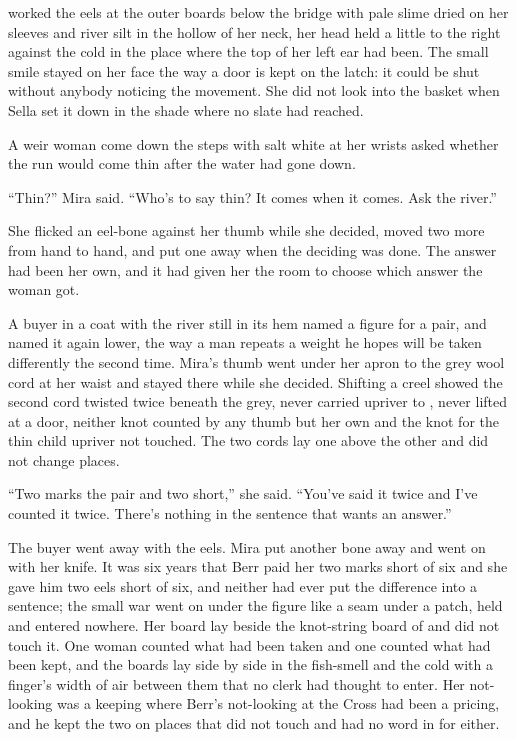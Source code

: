  worked the eels at the outer boards below the bridge with pale slime dried on her sleeves and river silt in the hollow of her neck, her head held a little to the right against the cold in the place where the top of her left ear had been. The small smile stayed on her face the way a door is kept on the latch: it could be shut without anybody noticing the movement. She did not look into the basket when Sella set it down in the shade where no slate had reached.

A weir woman come down the steps with salt white at her wrists asked whether the run would come thin after the water had gone down.

“Thin?” Mira said. “Who's to say thin? It comes when it comes. Ask the river.”

She flicked an eel-bone against her thumb while she decided, moved two more from hand to hand, and put one away when the deciding was done. The answer had been her own, and it had given her the room to choose which answer the woman got.

A buyer in a coat with the river still in its hem named a figure for a pair, and named it again lower, the way a man repeats a weight he hopes will be taken differently the second time. Mira's thumb went under her apron to the grey wool cord at her waist and stayed there while she decided. Shifting a creel showed the second cord twisted twice beneath the grey, never carried upriver to , never lifted at a door, neither knot counted by any thumb but her own and the knot for the thin child upriver not touched. The two cords lay one above the other and did not change places.

“Two marks the pair and two short,” she said. “You've said it twice and I've counted it twice. There's nothing in the sentence that wants an answer.”

The buyer went away with the eels. Mira put another bone away and went on with her knife. It was six years that Berr paid her two marks short of six and she gave him two eels short of six, and neither had ever put the difference into a sentence; the small war went on under the figure like a seam under a patch, held and entered nowhere. Her board lay beside the knot-string board of  and did not touch it. One woman counted what had been taken and one counted what had been kept, and the boards lay side by side in the fish-smell and the cold with a finger's width of air between them that no clerk had thought to enter. Her not-looking was a keeping where Berr's not-looking at the Cross had been a pricing, and he kept the two on places that did not touch and had no word in  for either.

